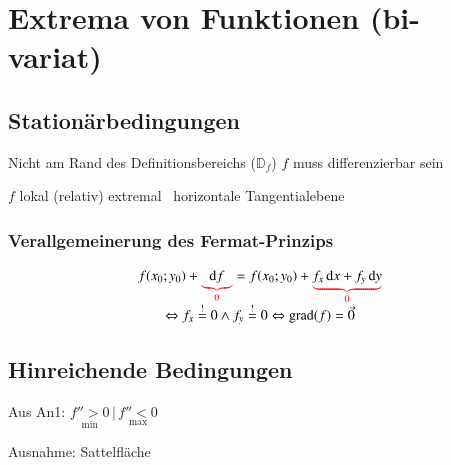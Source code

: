 \section{Extrema von Funktionen (bi-variat)}


\subsection{Stationärbedingungen} %
\begin{outline}
    \1 Nicht am Rand des Definitionsbereichs ($\mathbb{D}_f$)
    \1 $f$ muss differenzierbar sein
\end{outline}

$f$ lokal (relativ) extremal \textrightarrow\ horizontale Tangentialebene


\subsubsection{Verallgemeinerung des Fermat-Prinzips}
\[
    \begin{array}{c}
        f(x_0; y_0) + \cub{red}{\diff f}{0} = f(x_0; y_0) + \cub{red}{f_x \diff x + f_y \diff y}{0}\\ %
        \Leftrightarrow f_x \overset{!}{=} 0 \land f_y \overset{!}{=} 0 \Leftrightarrow \grad(f) = \vec{0}
    \end{array}
\]


\subsection{Hinreichende Bedingungen}
Aus An1: $\underset{\min}{f'' > 0}\, |\, \underset{\max}{f'' < 0}$

Ausnahme: Sattelfläche

